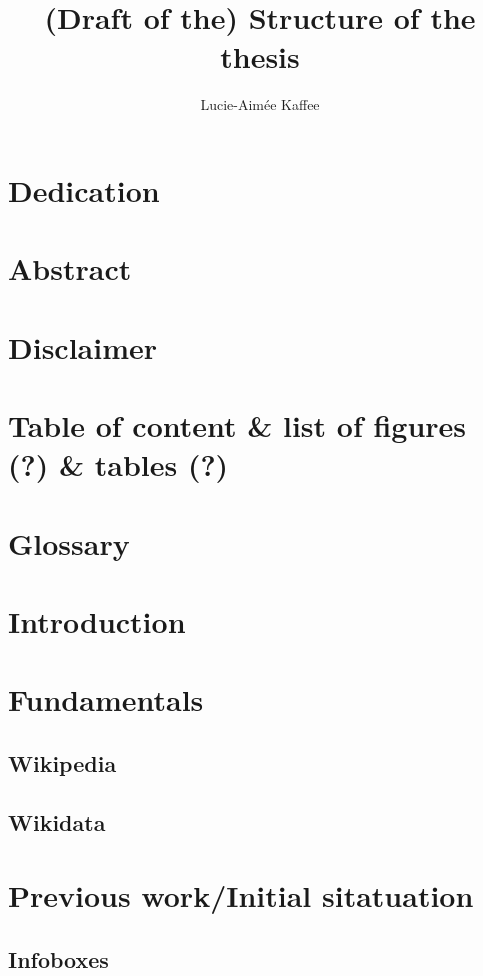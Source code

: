 \documentclass[11pt]{article}
\title {{(Draft of the) Structure of the thesis}}
\author {Lucie-Aim\'{e}e Kaffee}
\date{}
\begin{document}
  \maketitle
  \tableofcontents

  \section{Dedication}

  \section{Abstract}

  \section{Disclaimer}

  \section{Table of content \& list of figures (?) \& tables (?)}

  \section {Glossary}

  \section{Introduction}

  \section{Fundamentals}
  \subsection{Wikipedia}
  \subsection{Wikidata}

  \section{Previous work/Initial sitatuation}
  \subsection{Infoboxes}
\end{document}
